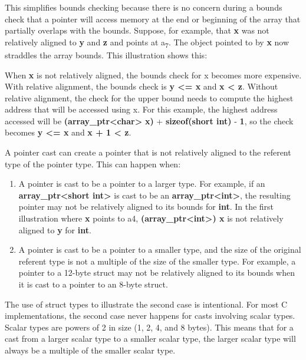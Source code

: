 \documentclass[]{article}
\begin{document}
This simplifies bounds checking because there is no concern during a
bounds check that a pointer will access memory at the end or beginning
of the array that partially overlaps with the bounds. Suppose, for
example, that \textbf{x} was not relatively aligned to \textbf{y} and
\textbf{z} and points at a\textsubscript{7}. The object pointed to by
\textbf{x} now straddles the array bounds. This illustration shows this:

When \textbf{x} is not relatively aligned, the bounds check for x
becomes more expensive. With relative alignment, the bounds check is
\textbf{y \textless{}= x} and \textbf{x \textless{} z}. Without relative
alignment, the check for the upper bound needs to compute the highest
address that will be accessed using x. For this example, the highest
address accessed will be
\textbf{(array\_ptr\textless{}char\textgreater{}} \textbf{x)} +
\textbf{sizeof(short int)} - \textbf{1}, so the check becomes \textbf{y
\textless{}= x} and \textbf{x + 1 \textless{} z}.

A pointer cast can create a pointer that is not relatively aligned to
the referent type of the pointer type. This can happen when:

\begin{enumerate}
\def\labelenumi{\arabic{enumi}.}
\item
  A pointer is cast to be a pointer to a larger type. For example, if an
  \textbf{array\_ptr\textless{}short int\textgreater{}} is cast to be an
  \textbf{array\_ptr\textless{}int\textgreater{}}, the resulting pointer
  may not be relatively aligned to its bounds for \textbf{int}. In the
  first illustration where \textbf{x} points to a4,
  \textbf{(array\_ptr\textless{}int\textgreater{}) x} is not relatively
  aligned to \textbf{y} for \textbf{int}.
\item
  A pointer is cast to be a pointer to a smaller type, and the size of
  the original referent type is not a multiple of the size of the
  smaller type. For example, a pointer to a 12-byte struct may not be
  relatively aligned to its bounds when it is cast to a pointer to an
  8-byte struct.
\end{enumerate}

The use of struct types to illustrate the second case is intentional.
For most C implementations, the second case never happens for casts
involving scalar types. Scalar types are powers of 2 in size (1, 2, 4,
and 8 bytes). This means that for a cast from a larger scalar type to a
smaller scalar type, the larger scalar type will always be a multiple of
the smaller scalar type.
\end{document}

